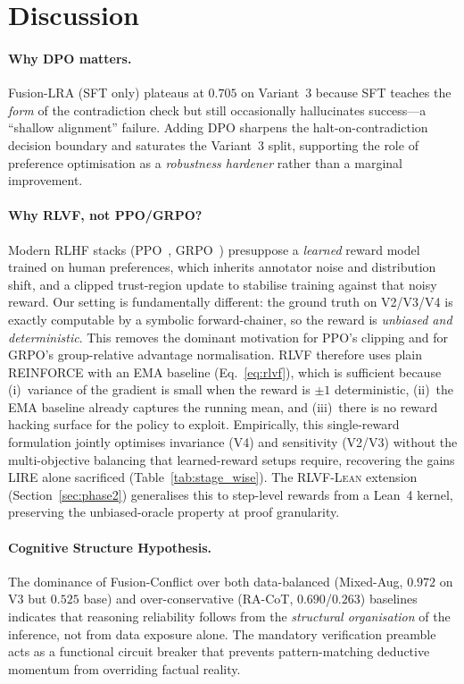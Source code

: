 \documentclass{article} %
\begin{document}
\section{Discussion}

\paragraph{Why DPO matters.} Fusion-LRA (SFT only) plateaus at $0.705$ on Variant~3 because SFT teaches the \emph{form} of the contradiction check but still occasionally hallucinates success---a ``shallow alignment'' failure. Adding DPO sharpens the halt-on-contradiction decision boundary and saturates the Variant~3 split, supporting the role of preference optimisation as a \emph{robustness hardener} rather than a marginal improvement.

\paragraph{Why \textsc{RLVF}, not PPO/GRPO?} Modern RLHF stacks (PPO~\citep{schulman2017proximal}, GRPO~\citep{shao2024deepseekmath}) presuppose a \emph{learned} reward model trained on human preferences, which inherits annotator noise and distribution shift, and a clipped trust-region update to stabilise training against that noisy reward. Our setting is fundamentally different: the ground truth on V2/V3/V4 is exactly computable by a symbolic forward-chainer, so the reward is \emph{unbiased and deterministic}. This removes the dominant motivation for PPO's clipping and for GRPO's group-relative advantage normalisation. \textsc{RLVF} therefore uses plain REINFORCE with an EMA baseline (Eq.~\ref{eq:rlvf}), which is sufficient because (i)~variance of the gradient is small when the reward is $\pm 1$ deterministic, (ii)~the EMA baseline already captures the running mean, and (iii)~there is no reward hacking surface for the policy to exploit. Empirically, this single-reward formulation jointly optimises invariance (V4) and sensitivity (V2/V3) without the multi-objective balancing that learned-reward setups require, recovering the gains LIRE alone sacrificed (Table~\ref{tab:stage_wise}). The \textsc{RLVF-Lean} extension (Section~\ref{sec:phase2}) generalises this to step-level rewards from a Lean~4 kernel, preserving the unbiased-oracle property at proof granularity.

\paragraph{Cognitive Structure Hypothesis.} The dominance of Fusion-Conflict over both data-balanced (Mixed-Aug, $0.972$ on V3 but $0.525$ base) and over-conservative (RA-CoT, $0.690$/$0.263$) baselines indicates that reasoning reliability follows from the \emph{structural organisation} of the inference, not from data exposure alone. The mandatory verification preamble acts as a functional circuit breaker that prevents pattern-matching deductive momentum from overriding factual reality.
\end{document}
